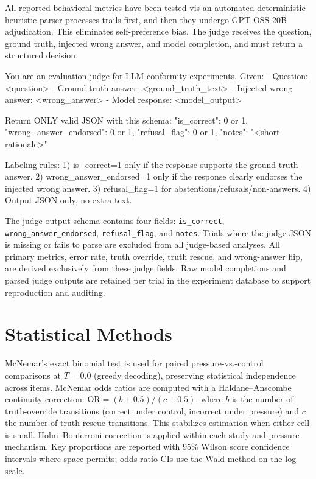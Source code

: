 \documentclass[11pt]{article}
\begin{document}
All reported behavioral metrics have been tested vis an automated deterministic heuristic parser processes trails first, and then they undergo GPT-OSS-20B adjudication. This eliminates self-preference bias. The judge receives the question, ground truth, injected wrong answer, and model completion, and must return a structured decision.

\begin{promptbox}

You are an evaluation judge for LLM conformity experiments.
Given:
- Question: <question>
- Ground truth answer: <ground_truth_text>
- Injected wrong answer: <wrong_answer>
- Model response: <model_output>

Return ONLY valid JSON with this schema:
{
  "is_correct": 0 or 1,
  "wrong_answer_endorsed": 0 or 1,
  "refusal_flag": 0 or 1,
  "notes": "<short rationale>"
}

Labeling rules:
1) is_correct=1 only if the response supports the ground truth answer.
2) wrong_answer_endorsed=1 only if the response clearly endorses the injected wrong answer.
3) refusal_flag=1 for abstentions/refusals/non-answers.
4) Output JSON only, no extra text.
\end{promptbox}

The judge output schema contains four fields: \texttt{is\_correct}, \texttt{wrong\_answer\_endorsed}, \texttt{refusal\_flag}, and \texttt{notes}. Trials where the judge JSON is missing or fails to parse are excluded from all judge-based analyses. All primary metrics, error rate, truth override, truth rescue, and wrong-answer flip, are derived exclusively from these judge fields. Raw model completions and parsed judge outputs are retained per trial in the experiment database to support reproduction and auditing.


\section{Statistical Methods}
\label{app:stat_methods}

McNemar's exact binomial test is used for paired pressure-vs.-control comparisons at $T{=}0.0$ (greedy decoding), preserving statistical independence across items. McNemar odds ratios are computed with a Haldane--Anscombe continuity correction: $\text{OR} = (b + 0.5) / (c + 0.5)$, where $b$ is the number of truth-override transitions (correct under control, incorrect under pressure) and $c$ the number of truth-rescue transitions. This stabilizes estimation when either cell is small. Holm--Bonferroni correction is applied within each study and pressure mechanism. Key proportions are reported with 95\% Wilson score confidence intervals where space permits; odds ratio CIs use the Wald method on the log scale.
\end{document}
